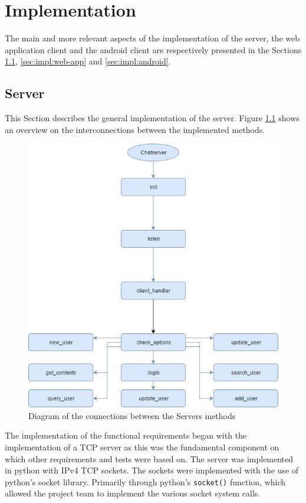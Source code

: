 \documentclass[finalReport.tex]{subfiles}
\begin{document}
\chapter{Implementation}

The main and more relevant aspects of the implementation of the server, the web application client and the android client are respectively presented in the Sections \ref{sec:impl:server}, \ref{sec:impl:web-app} and \ref{sec:impl:android}.

\section{Server}\label{sec:impl:server}
This Section describes the general implementation of the server. Figure \ref{Fig: server-methods} shows an overview on the interconnections between the implemented methods.  

\begin{figure}[h] 
\centering
\includegraphics[scale=0.35]{Implementation/Plot/Server_methods.jpg}
\caption{Diagram of the connections between the Servers methods}\label{Fig: server-methods}
\end{figure}

The implementation of the functional requirements began with the implementation of a TCP server as this was the fundamental component on which other requirements and tests were based on. The server was implemented in python with IPv4 TCP sockets. The sockets were implemented with the use of python's socket library. Primarily through python's \lstinline'socket()' function, which allowed the project team to implement the various socket system calls. 
\end{document}
